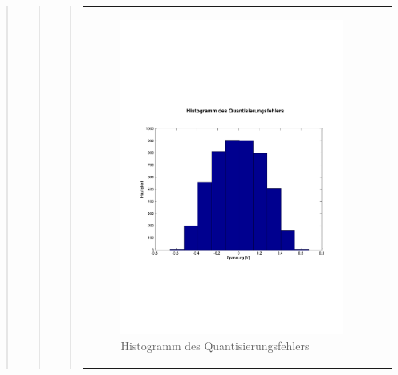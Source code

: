 \begin{quote}
\begin{quote}
\begin{quote}
\begin{center}
\begin{tabular}{ll}
                    \begin{minipage}{0.6\textwidth}
                        \begin{figure}[H]
                            \includegraphics[scale=0.4, trim = 0cm 7cm 0cm
                            7.5cm, clip]
                            {./Bilder/drei8_Histogramm}
                              \caption{Histogramm des Quantisierungsfehlers}
                        \end{figure}
                    \end{minipage}
                
                \end{tabular}
            \end{center}
            \vspace{1em}
            
            

\end{quote}
\end{quote}
\end{quote}
